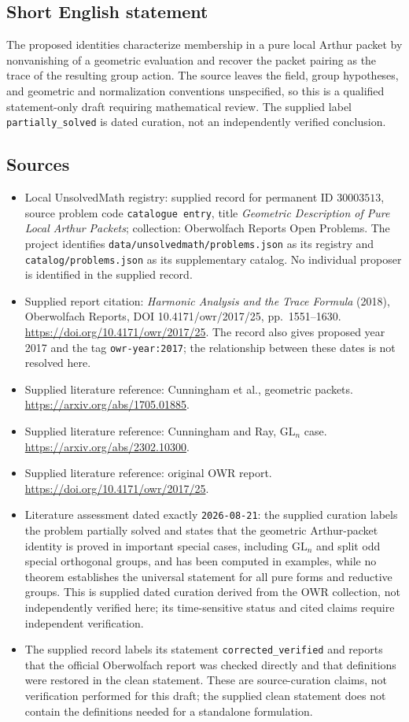 \documentclass[11pt]{article}
\begin{document}
\subsection{Short English statement}
The proposed identities characterize membership in a pure local Arthur packet by nonvanishing of a geometric evaluation and recover the packet pairing as the trace of the resulting group action. The source leaves the field, group hypotheses, and geometric and normalization conventions unspecified, so this is a qualified statement-only draft requiring mathematical review. The supplied label \texttt{partially\_solved} is dated curation, not an independently verified conclusion.
\subsection{Sources}
\begin{itemize}
\item Local UnsolvedMath registry: supplied record for permanent ID \(30003513\), source problem code \texttt{catalogue entry}, title \emph{Geometric Description of Pure Local Arthur Packets}; collection: Oberwolfach Reports Open Problems. The project identifies \texttt{data/unsolvedmath/problems.json} as its registry and \texttt{catalog/problems.json} as its supplementary catalog. No individual proposer is identified in the supplied record.
\item Supplied report citation: \emph{Harmonic Analysis and the Trace Formula} (2018), Oberwolfach Reports, DOI 10.4171/owr/2017/25, pp.\ 1551--1630. \url{https://doi.org/10.4171/owr/2017/25}. The record also gives proposed year 2017 and the tag \texttt{owr-year:2017}; the relationship between these dates is not resolved here.
\item Supplied literature reference: Cunningham et al., geometric packets. \url{https://arxiv.org/abs/1705.01885}.
\item Supplied literature reference: Cunningham and Ray, \(\mathrm{GL}_n\) case. \url{https://arxiv.org/abs/2302.10300}.
\item Supplied literature reference: original OWR report. \url{https://doi.org/10.4171/owr/2017/25}.
\item Literature assessment dated exactly \texttt{2026-08-21}: the supplied curation labels the problem partially solved and states that the geometric Arthur-packet identity is proved in important special cases, including \(\mathrm{GL}_n\) and split odd special orthogonal groups, and has been computed in examples, while no theorem establishes the universal statement for all pure forms and reductive groups. This is supplied dated curation derived from the OWR collection, not independently verified here; its time-sensitive status and cited claims require independent verification.
\item The supplied record labels its statement \texttt{corrected\_verified} and reports that the official Oberwolfach report was checked directly and that definitions were restored in the clean statement. These are source-curation claims, not verification performed for this draft; the supplied clean statement does not contain the definitions needed for a standalone formulation.
\end{itemize}
\end{document}
